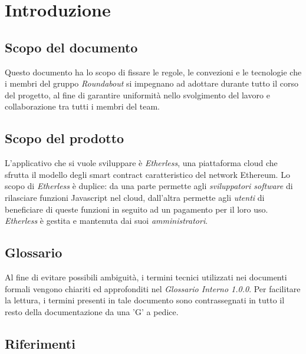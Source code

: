 \section{Introduzione}

\subsection{Scopo del documento}
Questo documento ha lo scopo di fissare le regole, le convezioni e le tecnologie che i membri del gruppo \textit{Roundabout} si impegnano ad adottare durante tutto il corso del progetto, al fine di garantire uniformità nello svolgimento del lavoro e collaborazione tra tutti i membri del team.

\subsection{Scopo del prodotto}
L'applicativo che si vuole sviluppare è \textit{Etherless}, una piattaforma cloud che sfrutta il modello degli smart contract caratteristico del network Ethereum. Lo scopo di \textit{Etherless} è duplice: da una parte permette agli \textit{sviluppatori software} di rilasciare funzioni Javascript nel cloud, dall'altra permette agli \textit{utenti} di beneficiare di queste funzioni in seguito ad un pagamento per il loro uso. %
\textit{Etherless} è gestita e mantenuta dai suoi \textit{amministratori}.

\subsection{Glossario}
Al fine di evitare possibili ambiguità, i termini tecnici utilizzati nei documenti formali vengono chiariti ed approfonditi nel \textit{Glossario Interno 1.0.0}. Per facilitare la lettura, i termini presenti in tale documento sono contrassegnati in tutto il resto della documentazione da una 'G' a pedice.

\subsection{Riferimenti}


